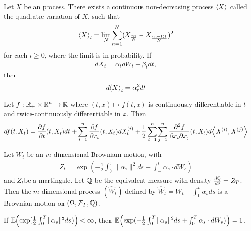\begin{thm}
  \label{sec:brown-moti-stoch-9}
  Let $X$ be an \ito process. There exists a continuous non-decreasing
  process $\IP{X}$ called the quadratic variation of $X$, such that
  \begin{align}
    \label{eq:18}
    \IP{X}_{t} = \lim_{N} \sum_{n=1}^{N} (X_{\frac{nt}{N}} - X_{\frac{(n-1)t}{N}})^{2}
  \end{align} for each $t \geq 0$, where the limit is in probability.
  If
  \begin{align}
    \label{eq:19}
    dX_{t} = \alpha_{t} dW_{t} + \beta_{t} dt,
  \end{align} then
  \begin{align}
    \label{eq:20}
    d \IP{X}_{t} = \alpha_{t}^{2} dt
  \end{align}
\end{thm}

\begin{thm}
  \label{sec:brown-moti-stoch-10}
  Let $f : \mathbb{R}_{+} \times \mathbb{R}^{n} \rightarrow \mathbb{R}$ where $(t, x) \mapsto
  f(t, x)$ is continuously differentiable in $t$ and
  twice-continuously differentiable in $x$.  Then
  \begin{align}
    \label{eq:21}
    df(t, X_{t}) = \frac{\partial f}{\partial t} (t, X_{t}) dt +
    \sum_{i=1}^{n} \frac{\partial f}{\partial x_{i}} (t, X_{t})
    dX_{t}^{(i)} + \frac{1}{2} \sum_{i=1}^{n} \sum_{j=1}^{n}
    \frac{\partial^{2} f}{\partial x_{i} \partial x_{j}}(t, X_{t}) d
    \IP{X^{(i)}, X^{(j)}}
  \end{align}
\end{thm}

\begin{thm}
  \label{sec:brown-moti-stoch-11}
  Let $W_{t}$ be an $m$-dimensional Browniam motion, with
  \begin{align}
    \label{eq:22}
    Z_{t} = \exp(-\frac{1}{2} \int_{0}^{t} \| \alpha_{s} \|^{2} ds +
    \int_{-}^{t} \alpha_{s} \cdot dW_{s})
  \end{align} and $Z_{t}$be a martingale.  Let $\Q$ be the equivalent
  measure with density $\frac{d\Q}{d\Prob} = Z_{T}$.  Then the
  $m$-dimensional process $(\hat W_{t})$ defined by $\hat W_{t} =
  W_{t} - \int_{0}^{t} \alpha_{s} ds$ is a Brownian motion on
  $(\Omega, \mathcal{F}_{T}, \Q)$.
\end{thm}

\begin{thm}
  \label{sec:brown-moti-stoch-12}
  If $\E{\exp(\frac{1}{2} \int_{0}^{T} \| \alpha_{s} \|^{2} ds)} <
  \infty$, then $\E{\exp(-\frac{1}{2} \int_{0}^{T} \|\alpha_{s}\|^{2}
    ds + \int_{0}^{T} \alpha_{s} \cdot dW_{s})} = 1$.
\end{thm}

